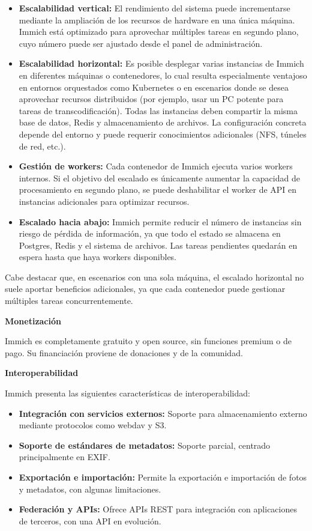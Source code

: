 \begin{itemize}
    \item \textbf{Escalabilidad vertical:} El rendimiento del sistema puede incrementarse mediante la ampliación de los recursos de hardware en una única máquina. Immich está optimizado para aprovechar múltiples tareas en segundo plano, cuyo número puede ser ajustado desde el panel de administración.
    \item \textbf{Escalabilidad horizontal:} Es posible desplegar varias instancias de Immich en diferentes máquinas o contenedores, lo cual resulta especialmente ventajoso en entornos orquestados como Kubernetes o en escenarios donde se desea aprovechar recursos distribuidos (por ejemplo, usar un PC potente para tareas de transcodificación). Todas las instancias deben compartir la misma base de datos, Redis y almacenamiento de archivos. La configuración concreta depende del entorno y puede requerir conocimientos adicionales (NFS, túneles de red, etc.).
    \item \textbf{Gestión de workers:} Cada contenedor de Immich ejecuta varios workers internos. Si el objetivo del escalado es únicamente aumentar la capacidad de procesamiento en segundo plano, se puede deshabilitar el worker de API en instancias adicionales para optimizar recursos.
    \item \textbf{Escalado hacia abajo:} Immich permite reducir el número de instancias sin riesgo de pérdida de información, ya que todo el estado se almacena en Postgres, Redis y el sistema de archivos. Las tareas pendientes quedarán en espera hasta que haya workers disponibles.
\end{itemize}

Cabe destacar que, en escenarios con una sola máquina, el escalado horizontal no suele aportar beneficios adicionales, ya que cada contenedor puede gestionar múltiples tareas concurrentemente.

\textbf{Monetización}

Immich es completamente gratuito y open source, sin funciones premium o de pago. Su financiación proviene de donaciones y de la comunidad.

\textbf{Interoperabilidad}

Immich presenta las siguientes características de interoperabilidad:

\begin{itemize}
    \item \textbf{Integración con servicios externos:} Soporte para almacenamiento externo mediante protocolos como \gls{webdav} y S3.
    \item \textbf{Soporte de estándares de metadatos:} Soporte parcial, centrado principalmente en EXIF.
    \item \textbf{Exportación e importación:} Permite la exportación e importación de fotos y metadatos, con algunas limitaciones.
    \item \textbf{Federación y APIs:} Ofrece APIs REST para integración con aplicaciones de terceros, con una API en evolución.
\end{itemize}

